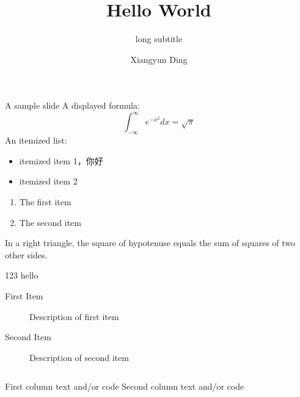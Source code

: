 \documentclass[10pt]{beamer}
\title{Hello World}
\subtitle[short subtitle]{long subtitle}
\author[dxy]{Xiangyun Ding}
\begin{document}
\frame{\titlepage}

\begin{frame}{A sample slide}
A displayed formula:
\[
  \int_{-\infty}^\infty e^{-x^2}dx = \sqrt{\pi}
\]
An itemized list:

\begin{itemize}
  \item itemized item 1，你好
  \item itemized item 2
\end{itemize}
\begin{enumerate}
  \item The first item
  \item The second item
\end{enumerate}

\end{frame}

\begin{frame}

\begin{theorem}{1.1}
  In a right triangle, \small{the square of hypotenuse equals
  the sum of squares of two} other sides.
\end{theorem}

\begin{block}{123}
  hello
\end{block}

\begin{description}
  \item[First Item] Description of first item
  \item[Second Item] Description of second item
\end{description}

\begin{columns}
  First column text and/or code
  Second column text and/or code
\end{columns}

\end{frame}
\end{document}
